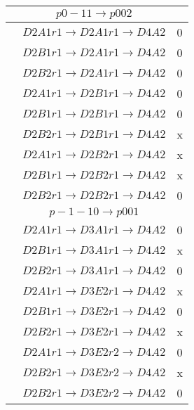 \documentclass[10pt]{article}
\begin{document}
\begin{table}[!htbp]
\begin{minipage}[!htbp]{0.33\textwidth}
\begin{tabular}{cc c}
\hline

\end{tabular}
\end{minipage}
\begin{minipage}[!htbp]{0.33\textwidth}
\begin{tabular}{cc c}
\raggedleft

 &$p0-11 \rightarrow p002 $& \\ \hline
 & $D2A1 r1 \rightarrow D2A1 r1 \rightarrow D4A2$ & 0\\
 & $D2B1 r1 \rightarrow D2A1 r1 \rightarrow D4A2$ &  0\\
 & $D2B2 r1 \rightarrow D2A1 r1 \rightarrow D4A2$ &  0\\
 & $D2A1 r1 \rightarrow D2B1 r1 \rightarrow D4A2$ &  0\\
 & $D2B1 r1 \rightarrow D2B1 r1 \rightarrow D4A2$ &  0\\
 & $D2B2 r1 \rightarrow D2B1 r1 \rightarrow D4A2$ &  x\\
 & $D2A1 r1 \rightarrow D2B2 r1 \rightarrow D4A2$ &  x\\
 & $D2B1 r1 \rightarrow D2B2 r1 \rightarrow D4A2$ &  x\\
 & $D2B2 r1 \rightarrow D2B2 r1 \rightarrow D4A2$ &  0\\
 
 
 
 \hline

 & $p-1-10 \rightarrow p001 $ \\ \hline
 & $D2A1 r1 \rightarrow D3A1 r1 \rightarrow D4A2$ & 0\\
 & $D2B1 r1 \rightarrow D3A1 r1 \rightarrow D4A2$ &  x\\
 & $D2B2 r1 \rightarrow D3A1 r1 \rightarrow D4A2$ &  0\\
 & $D2A1 r1 \rightarrow D3E2 r1 \rightarrow D4A2$ &  x\\
 & $D2B1 r1 \rightarrow D3E2 r1 \rightarrow D4A2$ &  0\\
 & $D2B2 r1 \rightarrow D3E2 r1 \rightarrow D4A2$ &  x\\
 & $D2A1 r1 \rightarrow D3E2 r2 \rightarrow D4A2$ &  0\\
 & $D2B2 r1 \rightarrow D3E2 r2 \rightarrow D4A2$ &  x\\
 & $D2B2 r1 \rightarrow D3E2 r2 \rightarrow D4A2$ &  0\\

\hline


\end{tabular}
\end{minipage}
\end{table}
\end{document}
